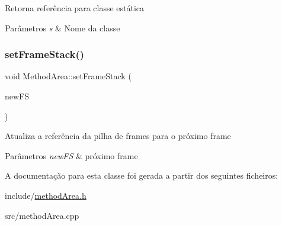 Retorna referência para classe estática


\begin{DoxyParams}{Parâmetros}
{\em s} & Nome da classe \\
\hline
\end{DoxyParams}
\mbox{\label{classMethodArea_af072c9b681a57a35a713b86fa61984d2}} 
\subsubsection{\texorpdfstring{set\+Frame\+Stack()}{setFrameStack()}}
{\footnotesize\ttfamily void Method\+Area\+::set\+Frame\+Stack (\begin{DoxyParamCaption}\item[{\hyperlink{classFrameStack}{Frame\+Stack} $\ast$}]{new\+FS }\end{DoxyParamCaption})\hspace{0.3cm}{\ttfamily [static]}}

Atualiza a referência da pilha de frames para o próximo frame


\begin{DoxyParams}{Parâmetros}
{\em new\+FS} & próximo frame \\
\hline
\end{DoxyParams}


A documentação para esta classe foi gerada a partir dos seguintes ficheiros\+:\begin{DoxyCompactItemize}
\item 
include/\hyperlink{methodArea_8h}{method\+Area.\+h}\item 
src/method\+Area.\+cpp\end{DoxyCompactItemize}
